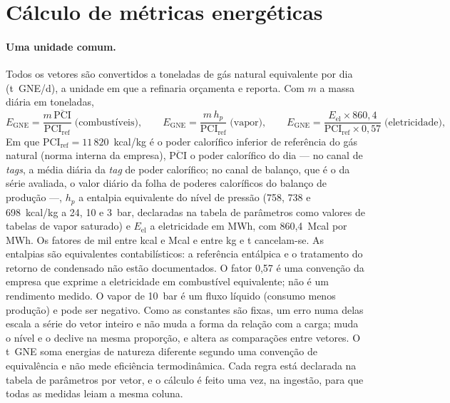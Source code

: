 \section{Cálculo de métricas energéticas}
\label{sec:metricas}

\paragraph{Uma unidade comum.} Todos os vetores são convertidos a
toneladas de gás natural equivalente por dia (t~GNE/d), a unidade em que
a refinaria orçamenta e reporta. Com $m$ a massa diária em toneladas,
\begin{equation}
E_{\mathrm{GNE}} = \frac{m\,\overline{\mathrm{PCI}}}{\mathrm{PCI}_{\mathrm{ref}}}
\;\text{(combustíveis)},\qquad
E_{\mathrm{GNE}} = \frac{m\,h_p}{\mathrm{PCI}_{\mathrm{ref}}}
\;\text{(vapor)},\qquad
E_{\mathrm{GNE}} = \frac{E_{\mathrm{el}}\times 860{,}4}{\mathrm{PCI}_{\mathrm{ref}}\times 0{,}57}
\;\text{(eletricidade)},
\label{eq:conversao-gne}
\end{equation}
Em que $\mathrm{PCI}_{\mathrm{ref}} = 11\,820$~kcal/kg é o poder calorífico
inferior de referência do gás natural (norma interna da empresa),
$\overline{\mathrm{PCI}}$ o poder calorífico do dia --- no canal de
\emph{tags}, a média diária da \emph{tag} de poder calorífico; no canal de
balanço, que é o da série avaliada, o valor diário da folha de poderes
caloríficos do balanço de produção ---, $h_p$ a entalpia equivalente do nível de pressão (758, 738 e
698~kcal/kg a 24, 10 e 3~bar, declaradas na tabela de parâmetros como
valores de tabelas de vapor saturado) e $E_{\mathrm{el}}$ a eletricidade em
MWh, com 860,4~Mcal por MWh. Os fatores de mil entre kcal e Mcal e entre kg
e t cancelam-se. As entalpias são equivalentes contabilísticos: a referência
entálpica e o tratamento do retorno de condensado não estão documentados. O
fator 0,57 é uma convenção da empresa que exprime a eletricidade em
combustível equivalente; não é um rendimento medido. O vapor de 10~bar é um
fluxo líquido (consumo menos produção) e pode ser negativo. Como as
constantes são fixas, um erro numa delas escala a série do vetor inteiro e
não muda a forma da relação com a carga; muda o nível e o declive na mesma
proporção, e altera as comparações entre vetores. O t~GNE soma energias de natureza
diferente segundo uma convenção de equivalência e não mede eficiência
termodinâmica. Cada regra está
declarada na tabela de parâmetros por vetor, e o cálculo é feito uma vez,
na ingestão, para que todas as medidas leiam a mesma coluna.

